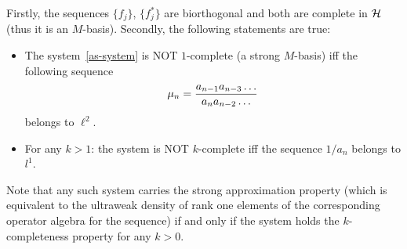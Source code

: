   \begin{theorem}
    \label{thm_as}
    Firstly, the sequences $\{f_j\}$, $\{f^*_j\}$ are biorthogonal and both are complete in $\cal{H}$ (thus it is an $M$-basis).
    Secondly, the following statements are true:
    \begin{itemize}
      \item  The system~\eqref{as-system} is NOT $1$-complete (a strong $M$-basis) iff the following sequence
        \begin{equation}
          \mu_n = \frac{a_{n-1} a_{n-3} \dots}{a_{n} a_{n-2} \dots }\\
        \end{equation}
        belongs to $\ell^2$.
      \item For any $k>1$: the system is NOT $k$-complete iff the sequence $1/a_n$ belongs to $l^1$.
    \end{itemize}
  \end{theorem}
  \begin{remark}
    Note that any such system carries the strong approximation property (which is equivalent to the
    ultraweak density of rank one elements of the corresponding operator algebra for the sequence) 
    if and only if the system holds the $k$-completeness property for any $k>0$.
  \end{remark}
